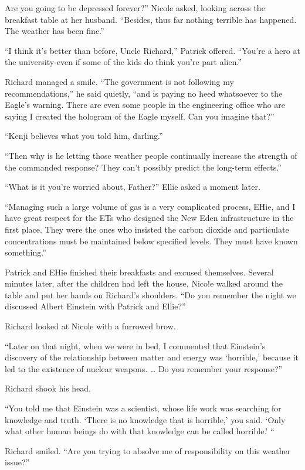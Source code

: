 \documentclass[]{article}
\begin{document}
{Are you going to be depressed forever?” Nicole asked, looking across the breakfast table at her husband.  “Besides, thus far nothing terrible has happened.  The weather has been fine.”

“I think it’s better than before, Uncle Richard,” Patrick offered.  “You’re a hero at the university-even if some of the kids do think you’re part alien.”

Richard managed a smile.  “The government is not following my recommendations,” he said quietly, “and is paying no heed whatsoever to the Eagle’s warning.  There are even some people in the engineering office who are saying I created the hologram of the Eagle myself.  Can you imagine that?”

“Kenji believes what you told him, darling.”

“Then why is he letting those weather people continually increase the strength of the commanded response? They can’t possibly predict the long-term effects.”

“What is it you’re worried about, Father?” Ellie asked a moment later.

“Managing such a large volume of gas is a very complicated process, EHie, and I have great respect for the ETs who designed the New Eden infrastructure in the first place.  They were the ones who insisted the carbon dioxide and particulate concentrations must be maintained below specified levels.  They must have known something.”

Patrick and EHie finished their breakfasts and excused themselves.  Several minutes later, after the children had left the house, Nico!e walked around the table and put her hands on Richard’s shoulders.  “Do you remember the night we discussed Albert Einstein with Patrick and Ellie?”

Richard looked at Nicole with a furrowed brow.

“Later on that night, when we were in bed, I commented that Einstein’s discovery of the relationship between matter and energy was ‘horrible,’ because it led to the existence of nuclear weapons.  … Do you remember your response?”

Richard shook his head.

“You told me that Einstein was a scientist, whose life work was searching for knowledge and truth.  ‘There is no knowledge that is horrible,’ you said.  ‘Only what other human beings do with that knowledge can be called horrible.’ “

Richard smiled.  “Are you trying to absolve me of responsibility on this weather issue?”

}
\end{document}
